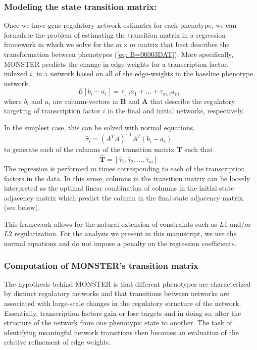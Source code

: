 \subsubsection*{Modeling the state transition matrix:} Once we have gene regulatory network estimates for each phenotype, we can formulate the problem of estimating the transition matrix in a regression framework in which we solve for the $m\times m$ matrix that best describes the transformation between phenotypes (\ref{eq: B=00003DAT}). More specifically, MONSTER predicts the change in edge-weights for a transcription factor, indexed $i$, in a network based on all of the edge-weights in the baseline phenotype network.
\[
E[b_{i}-a_{i}]=\tau_{1,i}a_{1}+\dots+\tau_{m,i}a_{m}
\]
where $b_{i}$ and $a_{i}$ are column-vectors in $\mathbf{B}$ and $\mathbf{A}$ that describe the regulatory targeting of transcription factor $i$ in the final and initial networks, respectively. 

In the simplest case, this can be solved with normal equations,
\[
\hat{\tau}_{i}=\left(A^{T}A\right)^{-1}A^{T}(b_{i}-a_{i})
\]
to generate each of the columns of the transition matrix $\mathbf{T}$ such that 
\[
\hat{\mathbf{T}}=\left[\hat{\tau}_{1},\hat{\tau}_{2},\dots,\hat{\tau}_{m}\right]
\]
The regression is performed $m$ times corresponding to each of the transcription factors in the data. In this sense, columns in the transition matrix can be loosely interpreted as the optimal linear combination of columns in the initial state adjacency matrix which predict the column in the final state adjacency matrix. (see below). 

This framework allows for the natural extension of constraints such as $L1$ and/or $L2$ regularization. For the analysis we present in this manuscript, we use the normal equations and do not impose a penalty on the regression coefficients.

\subsubsection*{Computation of MONSTER's transition matrix}

The hypothesis behind MONSTER is that different phenotypes are characterized by distinct regulatory networks and that transitions between networks are associated with large-scale changes in the regulatory structure of the network. Essentially, transcription factors gain or lose targets and in doing so, alter the structure of the network from one phenotypic state to another. The task of identifying meaningful network transitions then becomes an evaluation of the relative refinement of edge weights. 

